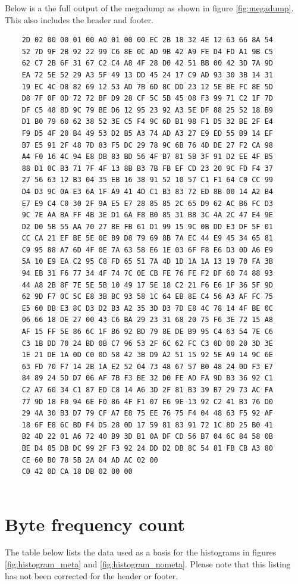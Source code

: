 \documentclass[a4paper,11pt,dvips]{article}
\begin{document}
Below is a the full output of the megadump as shown in figure \ref{fig:megadump}. This also includes the header and footer.
	\begin{verbatim}
	2D 02 00 00 01 00 A0 01 00 00 EC 2B 18 32 4E 12 63 66 8A 54
	52 7D 9F 2B 92 22 99 C6 8E 0C AD 9B 42 A9 FE D4 FD A1 9B C5
	62 C7 2B 6F 31 67 C2 C4 A8 4F 28 D0 42 51 BB 00 42 3D 7A 9D
	EA 72 5E 52 29 A3 5F 49 13 DD 45 24 17 C9 AD 93 30 3B 14 31
	19 EC 4C D8 82 69 12 53 AD 7B 6D 8C DD 23 12 5E BE FC 8E 5D
	D8 7F 0F 0D 72 72 BF D9 28 CF 5C 5B 45 08 F3 99 71 C2 1F 7D
	DF C5 48 8D 9C 79 BE D6 12 95 23 92 A3 5E DF 88 25 52 18 B9
	D1 B0 79 60 62 38 52 3E C5 F4 9C 6D B1 98 F1 D5 32 BE 2F E4
	F9 D5 4F 20 B4 49 53 D2 B5 A3 74 AD A3 27 E9 ED 55 B9 14 EF
	B7 E5 91 2F 48 7D 83 F5 DC 29 78 9C 6B 76 4D DE 27 F2 CA 98
	A4 F0 16 4C 94 E8 DB 83 BD 56 4F B7 81 5B 3F 91 D2 EE 4F B5
	88 D1 0C B3 71 7F 4F 13 8B B3 7B FB EF CD 23 20 9C FD F4 37
	27 56 63 12 B3 04 35 EB 16 38 91 52 10 57 C1 F1 64 C0 CC 99
	D4 D3 9C 0A E3 6A 1F A9 41 4D C1 B3 83 72 ED 8B 00 14 A2 B4
	E7 E9 C4 C0 30 2F 9A E5 E7 28 85 85 2C 65 D9 62 AC B6 FC D3
	9C 7E AA BA FF 4B 3E D1 6A F8 B0 85 31 B8 3C 4A 2C 47 E4 9E
	D2 D0 5B 55 AA 70 27 BE FB 61 D1 99 15 9C 0B DD E3 DF 5F 01
	CC CA 21 EF BE 5E 0E B9 D8 79 69 8B 7A EC 44 E9 45 34 65 81
	C9 95 88 A7 6D 4F 0E 7A 63 58 E6 1E 03 6F F8 E6 D3 0D A6 E9
	5A 10 E9 EA C2 95 C8 FD 65 51 7A 4D 1D 1A 1A 13 19 70 FA 3B
	94 EB 31 F6 77 34 4F 74 7C 0E CB FE 76 FE F2 DF 60 74 88 93
	44 A8 2B 8F 7E 5E 5B 10 49 17 5E 18 C2 21 F6 E6 1F 36 5F 9D
	62 9D F7 0C 5C E8 3B BC 93 58 1C 64 EB 8E C4 56 A3 AF FC 75
	E5 60 DB E3 8C D3 D2 B3 A2 35 3D D3 7D E8 4C 78 14 4F BE 0C
	06 66 18 DE 27 00 43 C6 BA 29 23 31 68 20 75 F6 3E 72 15 A8
	AF 15 FF 5E 86 6C 1F B6 92 BD 79 8E DE B9 95 C4 63 54 7E C6
	C3 1B DD 70 24 BD 0B C7 96 53 2F 6C 62 FC C3 0D 00 20 3D 3E
	1E 21 DE 1A 0D C0 0D 58 42 3B D9 A2 51 15 92 5E A9 14 9C 6E
	63 FD 70 F7 14 2B 1A E2 52 04 73 48 67 57 B0 48 24 0D F3 E7
	84 89 24 5D D7 06 AF 7B F3 BE 32 D0 FE AD FA 9D B3 36 92 C1
	C2 A7 60 34 C1 87 ED C8 14 A6 3D 2F 81 B3 39 B7 29 73 AC FA
	77 9D 18 F0 94 6E F0 86 4F F1 07 E6 9E 13 92 C2 41 B3 76 D0
	29 4A 30 B3 D7 79 CF A7 E8 75 EE 76 75 F4 04 48 63 F5 92 AF
	18 6F E8 6C BD F4 D5 28 0D 17 59 81 83 91 72 1C 8D 25 B0 41
	B2 4D 22 01 A6 72 40 B9 3D B1 0A DF CD 56 B7 04 6C 84 58 0B
	BE D4 85 DB DC 99 2F F3 92 24 DD D2 DB 8C 54 81 FB CB A3 80
	CE 60 B0 78 5B 2A 04 AD AC 02 00
	C0 42 0D CA 18 DB 02 00 00 
	
	\end{verbatim}
	\newpage
	\section{Byte frequency count}\label{app:bytefrq}
	The table below lists the data used as a basis for the histograms in figures \ref{fig:histogram_meta} and \ref{fig:histogram_nometa}. Please note that this listing has not been corrected for the header or footer. 
	
\end{document}
